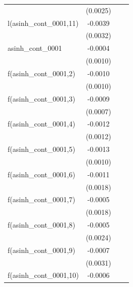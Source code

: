 \begin{tabular}{lccc}
                                    & (0.0025) &                       &   \\   
   l(asinh\_cont\_0001,11)          & -0.0039  &                       &   \\   
                                    & (0.0032) &                       &   \\   
   asinh\_cont\_0001                & -0.0004  &                       &   \\   
                                    & (0.0010) &                       &   \\   
   f(asinh\_cont\_0001,2)           & -0.0010  &                       &   \\   
                                    & (0.0010) &                       &   \\   
   f(asinh\_cont\_0001,3)           & -0.0009  &                       &   \\   
                                    & (0.0007) &                       &   \\   
   f(asinh\_cont\_0001,4)           & -0.0012  &                       &   \\   
                                    & (0.0012) &                       &   \\   
   f(asinh\_cont\_0001,5)           & -0.0013  &                       &   \\   
                                    & (0.0010) &                       &   \\   
   f(asinh\_cont\_0001,6)           & -0.0011  &                       &   \\   
                                    & (0.0018) &                       &   \\   
   f(asinh\_cont\_0001,7)           & -0.0005  &                       &   \\   
                                    & (0.0018) &                       &   \\   
   f(asinh\_cont\_0001,8)           & -0.0005  &                       &   \\   
                                    & (0.0024) &                       &   \\   
   f(asinh\_cont\_0001,9)           & -0.0007  &                       &   \\   
                                    & (0.0031) &                       &   \\   
   f(asinh\_cont\_0001,10)          & -0.0006  &                       &   \\   

\end{tabular}

